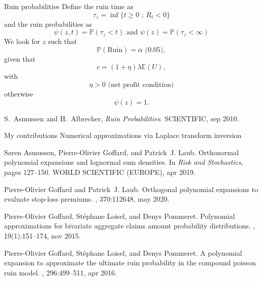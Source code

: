 \documentclass{beamer}
\begin{document}
\begin{frame}{Ruin probabilities}
\scriptsize
Define the ruin time as 
$$
\tau_z = \inf\{t\geq0\text{ ; }R_t <0\}
$$
and the ruin probabilities as 
$$
\psi(z,t) = \mathbb{P}(\tau_z < t)\text{ and }\psi(z) = \mathbb{P}(\tau_z < \infty)
$$
We look for $z$ such that 
$$
\mathbb{P}(\text{Ruin}) = \alpha\text{ (0.05)},
$$
given that 
$$
c=(1+\eta)\lambda\mathbb{E}(U),
$$
with 
$$\eta>0\text{ (net profit condition)}$$  
otherwise 
$$\psi(z)=1.$$

\tiny
\begin{thebibliography}{1}

S.~Asmussen and H.~Albrecher, {\em Ruin Probabilities}.
 {SCIENTIFIC}, sep 2010.

\end{thebibliography}

\end{frame}
\begin{frame}{My contributions}
Numerical approximations via Laplace transform inversion 
\tiny
\begin{thebibliography}{1}

S{\o}ren Asmussen, Pierre-Olivier Goffard, and Patrick~J. Laub.
\newblock Orthonormal polynomial expansions and lognormal sum densities.
\newblock In {\em Risk and Stochastics}, pages 127--150. {WORLD} {SCIENTIFIC}
  ({EUROPE}), apr 2019.

Pierre-Olivier Goffard and Patrick~J. Laub.
\newblock Orthogonal polynomial expansions to evaluate stop-loss premiums.
, 370:112648,
  may 2020.

Pierre-Olivier Goffard, St{\'{e}}phane Loisel, and Denys Pommeret.
\newblock Polynomial approximations for bivariate aggregate claims amount
  probability distributions.
,
  19(1):151--174, nov 2015.

Pierre-Olivier Goffard, St{\'{e}}phane Loisel, and Denys Pommeret.
\newblock A polynomial expansion to approximate the ultimate ruin probability
  in the compound poisson ruin model.
, 296:499--511,
  apr 2016.

\end{thebibliography}


\end{frame}
\end{document}
